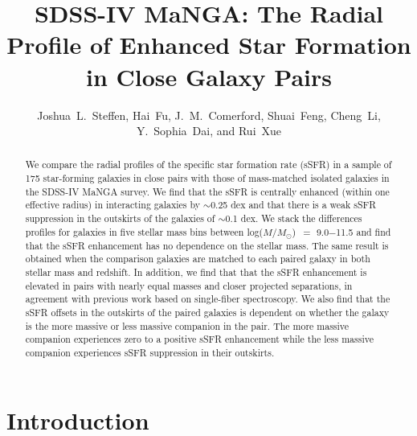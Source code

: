 \documentclass[iop,revtex4,twocolumn,apj,numberedappendix,appendixfloats]{emulateapj}
\newcommand{\logm}{log($M/M_{\odot}$)}
\begin{document}
\title{
SDSS-IV MaNGA: The Radial Profile of Enhanced Star Formation in Close Galaxy Pairs
}

\author{
Joshua~L.~Steffen, Hai~Fu, J.~M.~Comerford, Shuai~Feng, Cheng~Li, Y.~Sophia~Dai, and Rui~Xue
}

\begin{abstract}
We compare the radial profiles of the specific star formation rate (sSFR) in a sample of 175 star-forming galaxies in close pairs with those of mass-matched isolated galaxies in the SDSS-IV MaNGA survey. We find that the sSFR is centrally enhanced (within one effective radius) in interacting galaxies by $\sim$0.25 dex and that there is a weak sSFR suppression in the outskirts of the galaxies of $\sim$0.1 dex. We stack the differences profiles for galaxies in five stellar mass bins between \logm\ $=$ 9.0$-$11.5 and find that the sSFR enhancement has no dependence on the stellar mass. The same result is obtained when the comparison galaxies are matched to each paired galaxy in both stellar mass and redshift. In addition, we find that that the sSFR enhancement is elevated in pairs with nearly equal masses and closer projected separations, in agreement with previous work based on single-fiber spectroscopy. We also find that the sSFR offsets in the outskirts of the paired galaxies is dependent on whether the galaxy is the more massive or less massive companion in the pair. The more massive companion experiences zero to a positive sSFR enhancement while the less massive companion experiences sSFR suppression in their outskirts.
\end{abstract}


\section{Introduction}\label{sec:intro}
\end{document}
